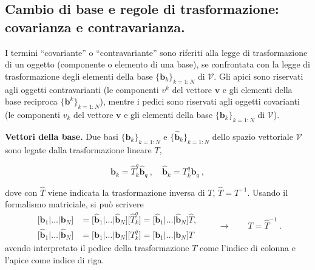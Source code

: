   \subsection{Cambio di base e regole di trasformazione: covarianza e contravarianza.}\label{ch:tensori:cambio_base}
  I termini ``covariante'' o ``contravariante'' sono riferiti alla legge di trasformazione di un oggetto (componente o elemento di una base), se confrontata con la legge di trasformazione degli elementi della base $\{ \bm{b}_k \}_{k=1:N}$ di $\mathcal{V}$.
  Gli apici sono riservati agli oggetti contravarianti (le componenti $v^k$ del vettore $\bm{v}$ e gli elementi della base reciproca $\{ \bm{b}^k \}_{k=1:N}$), mentre i pedici sono riservati agli oggetti covarianti (le componenti $v_k$ del vettore $\bm{v}$ e gli elementi della base $\{ \bm{b}_k \}_{k=1:N}$ di $\mathcal{V}$).
  
\vspace{5pt} \noindent
\textbf{Vettori della base.} Due basi $\{ \bm{b}_k \}_{k=1:N}$ e $\{ \bm{\hat{b}}_k \}_{k=1:N}$ dello spazio vettoriale $\mathcal{V}$ sono legate dalla trasformazione lineare $T$,
\begin{fBox}
\begin{equation}\label{eqn:b2b:t}
  \bm{b}_k = \hat{T}^q_k \bm{\hat{b}}_q \ , \quad \bm{\hat{b}}_k = {T}^q_k \bm{b}_q \ ,
\end{equation}
\end{fBox}
 dove con $\hat{T}$ viene indicata la trasformazione inversa di $T$, $\hat{T} = T^{-1}$. Usando il formalismo matriciale, si può scrivere
\begin{equation}
\begin{aligned}
 \big[ \bm{b}_1 | \dots | \bm{b}_N\big] & =
    \big[ \bm{\hat{b}}_1 | \dots | \bm{\hat{b}}_N\big] \big[ \hat{T}^{q}_{k} \big] =
    \big[ \bm{\hat{b}}_1 | \dots | \bm{\hat{b}}_N\big] \hat{T} , \\
    \big[ \bm{\hat{b}}_1 | \dots | \bm{\hat{b}}_N\big] & =
    \big[ \bm{b}_1 | \dots | \bm{b}_N\big] \big[ T^{q}_{k} \big] =
    \big[ \bm{b}_1 | \dots | \bm{b}_N\big] T
\end{aligned} \qquad \rightarrow \qquad T = \hat{T}^{-1} \ .
\end{equation}
avendo interpretato il pedice della trasformazione $T$ come l'indice di colonna e l'apice come indice di riga.

